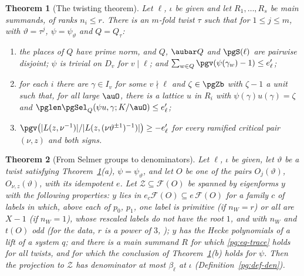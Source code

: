 \documentclass[10pt]{amsart}
\newtheorem{theorem}{Theorem}[section]
\theoremstyle{definition}
\theoremstyle{remark}
\begin{document}
\begin{theorem}[The twisting theorem]\label{pg:II}
Let $\ell$, $\iota$ be given and let $R_1,\dots,R_s$ be main summands, of ranks $n_i\le r$. There
is an $m$-fold twist $\tau$ such that for $1\le j\le m$, with $\vartheta=\tau^j$,
$\psi=\psi_\vartheta$ and $Q=Q_\tau$:
\begin{enumerate}
\item[(a)] the places of $Q$ have prime norm, and $Q$, $\aubar Q$ and $\pgS(\ell)$ are pairwise
disjoint; $\psi$ is trivial on $D_v$ for $v\mid\ell$; and $\sum_{w\in Q}\pgv(\psi(\gamma_w)-1)\le
e'_\ell$;
\item[(b)] for each $i$ there are $\gamma\in I_v$ for some $v\nmid\ell$ and $\zeta\in\pgZb$ with
$\zeta-1$ a unit such that, for all large $\auO$, there is a lattice $u$ in $R_i$ with
$\psi(\gamma)u(\gamma)=\zeta$ and $\pglen\pgSel_Q(\psi u,\gamma;K/\auO)\le e'_\ell$;
\item[(c)] $\pgv\bigl(|L(z,\nu^{-1})|/|L(z,(\nu\vartheta^{\pm1})^{-1})|\bigr)\ge-e'_\ell$ for every
ramified critical pair $(\nu,z)$ and both signs.
\end{enumerate}
\end{theorem}

\begin{theorem}[From Selmer groups to denominators]\label{pg:III}
Let $\ell$, $\iota$ be given, let $\vartheta$ be a twist satisfying
Theorem~\ref{pg:II}(a), $\psi=\psi_\vartheta$, and let $O$ be one of the pairs
$O_j(\vartheta)$, $O_{\nu,z}(\vartheta)$, with its idempotent $e$. Let $\mathcal Z\subseteq
\mathcal F(O)$ be spanned by eigenforms $y$ with the following properties: $y$ lies in
$e_c\mathcal F(O)\subseteq e\,\mathcal F(O)$ for a family $c$ of labels in which, above each of
$p_0$, $p_1$, one label is primitive (if $n_W=r$) or all are $X-1$ (if $n_W=1$), whose rescaled labels do not have the root $1$, and with $n_W$ and $t(O)$ odd (for the data, $r$ is a power of $3$, {\cite[Lemma~13.4(S7)]{P46}}); $y$ has the Hecke polynomials of a lift of a system
$q$; and there is a main summand $R$ for which \eqref{pg:eq-trace} holds for all twists, and for
which the conclusion of Theorem~\ref{pg:II}(b) holds for $\psi$. Then the projection to
$\mathcal Z$ has denominator at most $\beta_\ell$ at $\iota$ (Definition~\ref{pg:def-den}).
\end{theorem}
\end{document}
